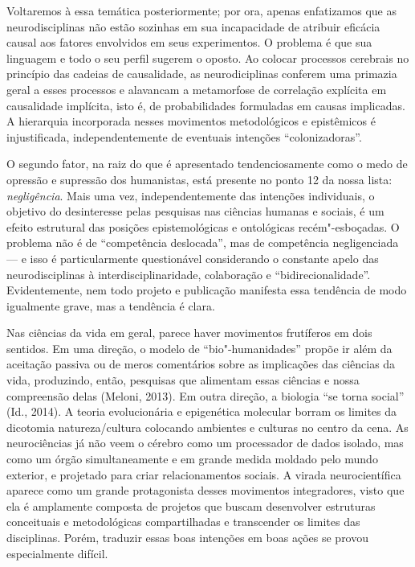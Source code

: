 Voltaremos à essa temática posteriormente; por ora, apenas enfatizamos
que as neurodisciplinas não estão sozinhas em sua incapacidade de
atribuir eficácia causal aos fatores envolvidos em seus experimentos. O
problema é que sua linguagem e todo o seu perfil sugerem o oposto. Ao
colocar processos cerebrais no princípio das cadeias de causalidade, as
neurodiciplinas conferem uma primazia geral a esses processos e
alavancam a metamorfose de correlação explícita em causalidade
implícita, isto é, de probabilidades formuladas em causas implicadas. A
hierarquia incorporada nesses movimentos metodológicos e epistêmicos é
injustificada, independentemente de eventuais intenções
``colonizadoras''.

O segundo fator, na raiz do que é apresentado tendenciosamente como o
medo de opressão e supressão dos humanistas, está presente no ponto 12
da nossa lista: \emph{negligência}. Mais uma vez, independentemente das
intenções individuais, o objetivo do desinteresse pelas pesquisas nas
ciências humanas e sociais, é um efeito estrutural das posições
epistemológicas e ontológicas recém"-esboçadas. O problema não é de
``competência deslocada'', mas de competência negligenciada --- e
isso é particularmente questionável considerando o constante apelo das
neurodisciplinas à interdisciplinaridade, colaboração e
``bidirecionalidade''. Evidentemente, nem todo projeto e publicação
manifesta essa tendência de modo igualmente grave, mas a tendência é
clara.

Nas ciências da vida em geral, parece haver movimentos frutíferos em
dois sentidos. Em uma direção, o modelo de ``bio"-humanidades'' propõe ir
além da aceitação passiva ou de meros comentários sobre as implicações
das ciências da vida, produzindo, então, pesquisas que alimentam essas
ciências e nossa compreensão delas (Meloni, 2013). Em outra direção, a
biologia ``se torna social'' (Id., 2014). A teoria evolucionária e
epigenética molecular borram os limites da dicotomia natureza/cultura
colocando ambientes e culturas no centro da cena. As neurociências já
não veem o cérebro como um processador de dados isolado, mas como um
órgão simultaneamente e em grande medida moldado pelo mundo exterior, e
projetado para criar relacionamentos sociais. A virada neurocientífica
aparece como um grande protagonista desses movimentos integradores,
visto que ela é amplamente composta de projetos que buscam desenvolver
estruturas conceituais e metodológicas compartilhadas e transcender os
limites das disciplinas. Porém, traduzir essas boas intenções em boas
ações se provou especialmente difícil.

